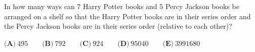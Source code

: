In how many ways can $7$ Harry Potter books and $5$ Percy Jackson books be arranged on a shelf so that the Harry Potter books are in their series order and the Percy Jackson books are in their series order (relative to each other)?

$\textbf{(A)}\ 495\qquad\textbf{(B)}\ 792\qquad\textbf{(C)}\ 924\qquad\textbf{(D)}\ 95040\qquad\textbf{(E)}\ 3991680$
